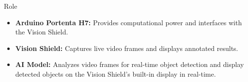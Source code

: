 \documentclass[10pt, a4paper]{beamer}
\begin{document}
	\begin{frame}
		
		\begin{block}{Role}
			\begin{itemize}
				\item \textbf{Arduino Portenta H7:} Provides computational power and interfaces with the Vision Shield.
				\item \textbf{Vision Shield:} Captures live video frames and displays annotated results.
				\item \textbf{AI Model:} Analyzes video frames for real-time object detection and display detected objects on the Vision Shield's built-in display in real-time.
			\end{itemize}
		\end{block}
		
	\end{frame}
	
\end{document}
